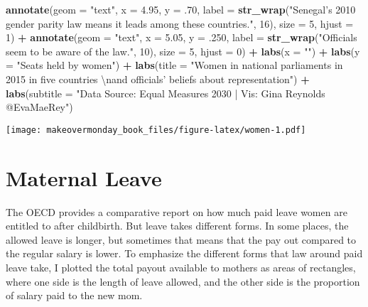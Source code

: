\documentclass[]{book}
\newenvironment{Shaded}{\begin{snugshade}}{\end{snugshade}}
\newcommand{\KeywordTok}[1]{\textcolor[rgb]{0.13,0.29,0.53}{\textbf{#1}}}
\newcommand{\DataTypeTok}[1]{\textcolor[rgb]{0.13,0.29,0.53}{#1}}
\newcommand{\DecValTok}[1]{\textcolor[rgb]{0.00,0.00,0.81}{#1}}
\newcommand{\FloatTok}[1]{\textcolor[rgb]{0.00,0.00,0.81}{#1}}
\newcommand{\CharTok}[1]{\textcolor[rgb]{0.31,0.60,0.02}{#1}}
\newcommand{\StringTok}[1]{\textcolor[rgb]{0.31,0.60,0.02}{#1}}
\newcommand{\OperatorTok}[1]{\textcolor[rgb]{0.81,0.36,0.00}{\textbf{#1}}}
\newcommand{\NormalTok}[1]{#1}
\theoremstyle{definition}
\theoremstyle{definition}
\theoremstyle{definition}
\theoremstyle{remark}
\begin{document}
\begin{Shaded}
\begin{Highlighting}[]
\StringTok{  }\KeywordTok{annotate}\NormalTok{(}\DataTypeTok{geom =} \StringTok{"text"}\NormalTok{, }\DataTypeTok{x =} \FloatTok{4.95}\NormalTok{, }\DataTypeTok{y =}\NormalTok{ .}\DecValTok{70}\NormalTok{, }\DataTypeTok{label =} \KeywordTok{str_wrap}\NormalTok{(}\StringTok{"Senegal's 2010 gender parity law means it leads among these countries."}\NormalTok{, }\DecValTok{16}\NormalTok{), }\DataTypeTok{size =} \DecValTok{5}\NormalTok{, }\DataTypeTok{hjust =} \DecValTok{1}\NormalTok{) }\OperatorTok{+}
\StringTok{  }\KeywordTok{annotate}\NormalTok{(}\DataTypeTok{geom =} \StringTok{"text"}\NormalTok{, }\DataTypeTok{x =} \FloatTok{5.05}\NormalTok{, }\DataTypeTok{y =}\NormalTok{ .}\DecValTok{250}\NormalTok{, }\DataTypeTok{label =} \KeywordTok{str_wrap}\NormalTok{(}\StringTok{"Officials seem to be aware of the law."}\NormalTok{, }\DecValTok{10}\NormalTok{), }\DataTypeTok{size =} \DecValTok{5}\NormalTok{, }\DataTypeTok{hjust =} \DecValTok{0}\NormalTok{) }\OperatorTok{+}
\StringTok{  }\KeywordTok{labs}\NormalTok{(}\DataTypeTok{x =} \StringTok{""}\NormalTok{) }\OperatorTok{+}
\StringTok{  }\KeywordTok{labs}\NormalTok{(}\DataTypeTok{y =} \StringTok{"Seats held by women"}\NormalTok{) }\OperatorTok{+}
\StringTok{  }\KeywordTok{labs}\NormalTok{(}\DataTypeTok{title =} \StringTok{"Women in national parliaments in 2015 in five countries }\CharTok{\textbackslash{}n}\StringTok{and officials' beliefs about representation"}\NormalTok{) }\OperatorTok{+}
\StringTok{  }\KeywordTok{labs}\NormalTok{(}\DataTypeTok{subtitle =} \StringTok{"Data Source: Equal Measures 2030 | Vis: Gina Reynolds @EvaMaeRey"}\NormalTok{)}
\end{Highlighting}
\end{Shaded}

\texttt{[image: makeovermonday\_book\_files/figure-latex/women-1.pdf]}

\chapter{Maternal Leave}\label{maternal-leave}

The OECD provides a comparative report on how much paid leave women are
entitled to after childbirth. But leave takes different forms. In some
places, the allowed leave is longer, but sometimes that means that the
pay out compared to the regular salary is lower. To emphasize the
different forms that law around paid leave take, I plotted the total
payout available to mothers as areas of rectangles, where one side is
the length of leave allowed, and the other side is the proportion of
salary paid to the new mom.
\end{document}
